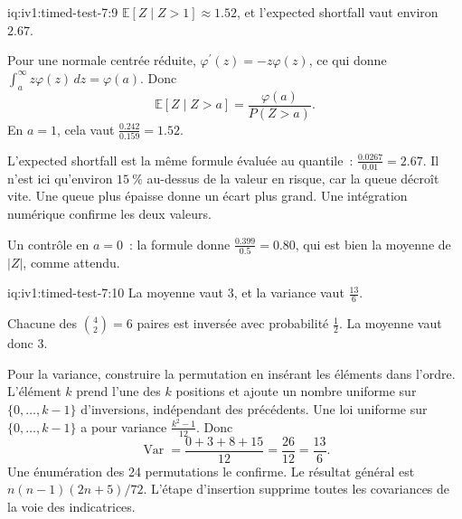 \begin{solution}{iq:iv1:timed-test-7:9}
$\mathbb{E}[Z \mid Z > 1] \approx 1.52$, et l'expected shortfall vaut environ $2.67$.

Pour une normale centrée réduite, $\varphi^\prime(z) = -z\varphi(z)$, ce qui donne $\int_a^\infty z\varphi(z)\,dz = \varphi(a)$. Donc
\[
\mathbb{E}[Z \mid Z > a] = \frac{\varphi(a)}{P(Z > a)}.
\]
En $a = 1$, cela vaut $\frac{0.242}{0.159} = 1.52$.

L'expected shortfall est la même formule évaluée au quantile~: $\frac{0.0267}{0.01} = 2.67$. Il n'est ici qu'environ $15~\%$ au-dessus de la valeur en risque, car la queue décroît vite. Une queue plus épaisse donne un écart plus grand. Une intégration numérique confirme les deux valeurs.

Un contrôle en $a = 0$~: la formule donne $\frac{0.399}{0.5} = 0.80$, qui est bien la moyenne de $|Z|$, comme attendu.

\end{solution}

\begin{solution}{iq:iv1:timed-test-7:10}
La moyenne vaut 3, et la variance vaut $\frac{13}{6}$.

Chacune des $\binom42 = 6$ paires est inversée avec probabilité $\frac12$. La moyenne vaut donc 3.

Pour la variance, construire la permutation en insérant les éléments dans l'ordre. L'élément $k$ prend l'une des $k$ positions et ajoute un nombre uniforme sur $\{0, \dots, k - 1\}$ d'inversions, indépendant des précédents. Une loi uniforme sur $\{0, \dots, k - 1\}$ a pour variance $\frac{k^2 - 1}{12}$. Donc
\[
\operatorname{Var} = \frac{0 + 3 + 8 + 15}{12} = \frac{26}{12} = \frac{13}{6}.
\]
Une énumération des 24 permutations le confirme. Le résultat général est $n(n - 1)(2n + 5)/72$. L'étape d'insertion supprime toutes les covariances de la voie des indicatrices.

\end{solution}

